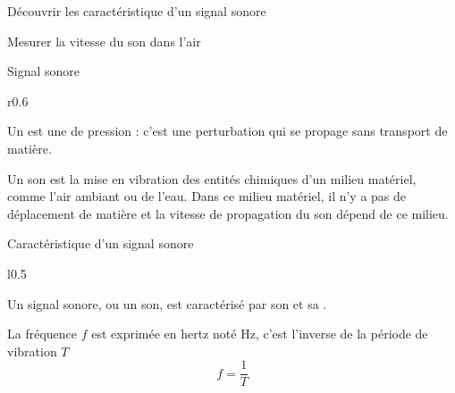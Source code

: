 \teteSndSign
{}

\vspace*{-24pt}


\begin{objectifs}
  \item Découvrir les caractéristique d'un signal sonore
  \item Mesurer la vitesse du son dans l'air
\end{objectifs}


\begin{doc}{Signal sonore}
  \vspace*{-36pt}
  \begin{wrapfigure}[5]{r}{0.6\linewidth}
    \vspace*{-28pt}
    \begin{center}
    \end{center}
  \end{wrapfigure}
  \begin{encart}
    Un  est une  de pression : c'est une perturbation qui se propage sans transport de matière.
  \end{encart}
  Un son est la mise en vibration des entités chimiques d'un milieu matériel, comme l'air ambiant ou de l'eau. 
  Dans ce milieu matériel, il n'y a pas de déplacement de matière et la vitesse de propagation du son dépend de ce milieu.
\end{doc}


\begin{doc}{Caractéristique d'un signal sonore}
  \vspace*{10pt}
  \begin{wrapfigure}[3]{l}{0.5\linewidth}
    \vspace*{-60pt}
    \begin{center}
    \end{center}
  \end{wrapfigure}
  Un signal sonore, ou un son, est caractérisé par son  et sa .
  
  \vspace*{40pt}
  \begin{encart}
    La fréquence $f$ est exprimée en hertz noté Hz, c'est l'inverse de la période de vibration $T$
    \begin{equation*}
      f = \frac{1}{T}
    \end{equation*}
  \end{encart}
\end{doc}



